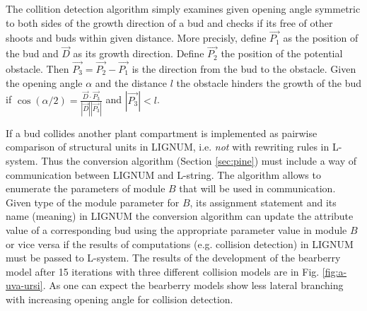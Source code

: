 The collition detection algorithm  simply examines given opening angle
symmetric to both sides of the growth direction of a bud and checks if
its  free  of other  shoots  and  buds  within given  distance.   More
precisly, define $\vec {P_1}$ as the  position of the bud and $\vec D$
as  its growth  direction. Define  $\vec  {P_2}$ the  position of  the
potential obstacle. Then $\vec {P_3} = \vec {P_2} - \vec {P_1}$ is the
direction  from the  bud  to  the obstacle.  Given  the opening  angle
$\alpha$ and the  distance $l$ the obstacle hinders  the growth of the
bud  if $\cos(\alpha/2) =  \frac{{\vec D}  \cdot {\vec  {P_3}}} {|\vec
  D||\vec {P_3}|}$ and $|\vec {P_3}| < l$.

If a bud collides another plant compartment is implemented as pairwise
comparison  of  structural units  in  LIGNUM,  i.e. \textsl{not}  with
rewriting rules  in L-system.  Thus the  conversion algorithm (Section
\ref{sec:pine}) must include a way of communication between LIGNUM and
L-string. The  algorithm allows to enumerate the  parameters of module
$B$  that will be  used in  communication.  Given  type of  the module
parameter for $B$, its assignment  statement and its name (meaning) in
LIGNUM the  conversion algorithm can  update the attribute value  of a
corresponding bud using the  appropriate parameter value in module $B$
or  vice  versa  if  the  results  of  computations  (e.g.   collision
detection) in  LIGNUM must be passed  to L-system. The  results of the
development  of the  bearberry model  after 15  iterations  with three
different collision models are  in Fig.  \ref{fig:a-uva-ursi}.  As one
can  expect the  bearberry  models show  less  lateral branching  with
increasing opening angle for collision detection.
 
